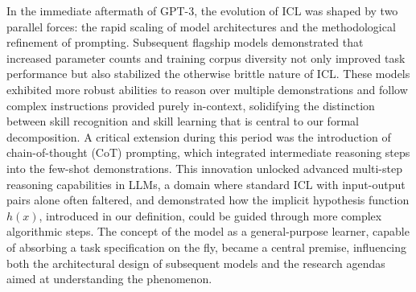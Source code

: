\documentclass[11pt]{article}
\begin{document}
In the immediate aftermath of GPT-3, the evolution of ICL was shaped by two parallel forces: the rapid scaling of model architectures and the methodological refinement of prompting. Subsequent flagship models demonstrated that increased parameter counts and training corpus diversity not only improved task performance but also stabilized the otherwise brittle nature of ICL. These models exhibited more robust abilities to reason over multiple demonstrations and follow complex instructions provided purely in-context, solidifying the distinction between skill recognition and skill learning that is central to our formal decomposition. A critical extension during this period was the introduction of chain-of-thought (CoT) prompting, which integrated intermediate reasoning steps into the few-shot demonstrations. This innovation unlocked advanced multi-step reasoning capabilities in LLMs, a domain where standard ICL with input-output pairs alone often faltered, and demonstrated how the implicit hypothesis function \(h(x)\), introduced in our definition, could be guided through more complex algorithmic steps. The concept of the model as a general-purpose learner, capable of absorbing a task specification on the fly, became a central premise, influencing both the architectural design of subsequent models and the research agendas aimed at understanding the phenomenon.
\end{document}
